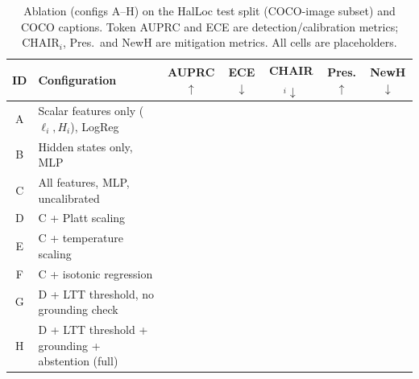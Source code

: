 \begin{table}[t]
\centering
\caption{Ablation (configs A--H) on the HalLoc test split (COCO-image subset) and COCO captions. Token AUPRC and ECE are detection/calibration metrics; CHAIR$_i$, Pres.\ and NewH are mitigation metrics. All cells are placeholders.}
\label{tab:ablation}
\small
\setlength{\tabcolsep}{3pt}
\begin{tabular}{clccccc}
\toprule
ID & Configuration & AUPRC$\uparrow$ & ECE$\downarrow$ & CHAIR$_i\downarrow$ & Pres.$\uparrow$ & NewH$\downarrow$ \\
\midrule
A & Scalar features only ($\ell_i,H_i$), LogReg      & \TBD{} & \TBD{} & \TBD{} & \TBD{} & \TBD{} \\
B & Hidden states only, MLP                          & \TBD{} & \TBD{} & \TBD{} & \TBD{} & \TBD{} \\
C & All features, MLP, uncalibrated                  & \TBD{} & \TBD{} & \TBD{} & \TBD{} & \TBD{} \\
D & C + Platt scaling                                & \TBD{} & \TBD{} & \TBD{} & \TBD{} & \TBD{} \\
E & C + temperature scaling                          & \TBD{} & \TBD{} & \TBD{} & \TBD{} & \TBD{} \\
F & C + isotonic regression                          & \TBD{} & \TBD{} & \TBD{} & \TBD{} & \TBD{} \\
G & D + LTT threshold, no grounding check            & \TBD{} & \TBD{} & \TBD{} & \TBD{} & \TBD{} \\
H & D + LTT threshold + grounding + abstention (full)& \TBD{} & \TBD{} & \TBD{} & \TBD{} & \TBD{} \\
\bottomrule
\end{tabular}
\end{table}
